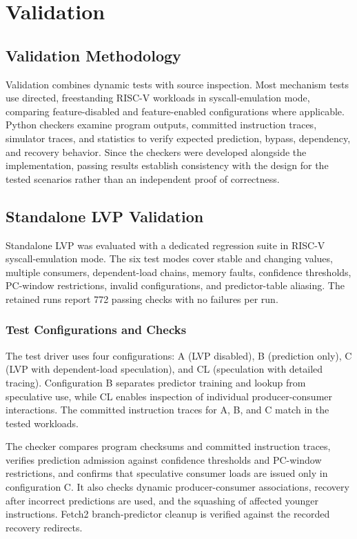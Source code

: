 \section{Validation}

\subsection{Validation Methodology}

Validation combines dynamic tests with source inspection. Most
mechanism tests use directed, freestanding RISC-V workloads in
syscall-emulation mode, comparing feature-disabled and feature-enabled
configurations where applicable. Python checkers examine program
outputs, committed instruction traces, simulator traces, and
statistics to verify expected prediction, bypass, dependency, and
recovery behavior. Since the checkers were developed alongside the
implementation, passing results establish consistency with the
design for the tested scenarios rather than an independent proof
of correctness.

\subsection{Standalone LVP Validation}

Standalone LVP was evaluated with a dedicated regression suite in
RISC-V syscall-emulation mode. The six test modes cover stable and changing
values, multiple consumers, dependent-load chains, memory faults,
confidence thresholds, PC-window restrictions, invalid configurations,
and predictor-table aliasing. The retained runs report 772 passing
checks with no failures per run.

\subsubsection{Test Configurations and Checks}

The test driver uses four configurations: A (LVP disabled), B
(prediction only), C (LVP with dependent-load speculation), and CL
(speculation with detailed tracing). Configuration B separates
predictor training and lookup from speculative use, while CL enables
inspection of individual producer-consumer interactions. The
committed instruction traces for A, B, and C match in the tested
workloads.

The checker compares program checksums and committed instruction
traces, verifies prediction admission against confidence thresholds
and PC-window restrictions, and confirms that speculative consumer
loads are issued only in configuration C. It also checks dynamic
producer-consumer associations, recovery after incorrect predictions
are used, and the squashing of affected younger instructions.
Fetch2 branch-predictor cleanup is verified against the recorded
recovery redirects.


